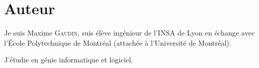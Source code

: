 \section{Auteur}
Je suis Maxime \textsc{Gaudin}, suis élève ingénieur de l'INSA de Lyon en
échange avec l'École Polytechnique de Montréal (attachée à l'Université de
Montréal).

J'étudie en génie informatique et logiciel.

